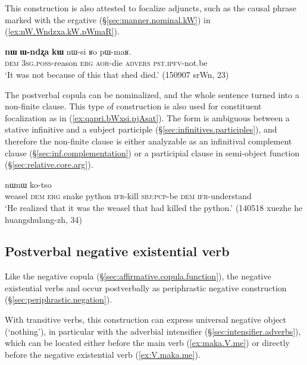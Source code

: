 This construction is also attested to focalize adjuncts, such as the causal phrase marked with the ergative (§\ref{sec:manner.nominal.kW}) in (\ref{ex:nW.Wndzxa.kW.pWmaR}).

\begin{exe}
\ex \label{ex:nW.Wndzxa.kW.pWmaR}
\gll  \textbf{nɯ} \textbf{ɯ-ndʐa} \textbf{kɯ} nɯ-si ʁo pɯ-maʁ. \\
\textsc{dem} \textsc{3sg}.\textsc{poss}-reason \textsc{erg} \textsc{aor}-die \textsc{advers} \textsc{pst}.\textsc{ipfv}-not.be \\
\glt `It was not because of this that shed died.' (150907 srWn, 23)
\end{exe}


The postverbal copula can be nominalized, and the whole sentence turned into a non-finite clause. This type of construction is also used for constituent focalization  as in (\ref{ex:qapri.bWxsi.pjAsat}). The form  is ambiguous between a stative infinitive and a subject participle (§\ref{sec:infinitives.participles}), and therefore the non-finite clause is either analyzable as an infinitival complement clause (§\ref{sec:inf.complementation}) or a participial clause in semi-object function (§\ref{sec:relative.core.arg}).

\begin{exe}
\ex \label{ex:qapri.bWxsi.pjAsat}
 nɯnɯ ko-tso \\
weasel \textsc{dem} \textsc{erg} snake python \textsc{ifr}-kill \textsc{sbj}:\textsc{pcp}-be \textsc{dem} \textsc{ifr}-understand \\
\glt `He realized that it was the weasel that had killed the python.' (140518 xuezhe he huangshulang-zh, 34)
\end{exe}

\subsection{Postverbal negative existential verb} \label{sec:negation.existential}
Like the negative copula  (§\ref{sec:affirmative.copula.function}), the negative existential verbs  and   occur postverbally as periphrastic negative construction (§\ref{sec:periphrastic.negation}).

With transitive verbs, this construction can express universal negative object (`nothing'), in particular with the adverbial intensifier  (§\ref{sec:intensifier.adverbs}), which can be located either before the main verb (\ref{ex:maka.V.me}) or directly before the negative existential verb  (\ref{ex:V.maka.me}). 

